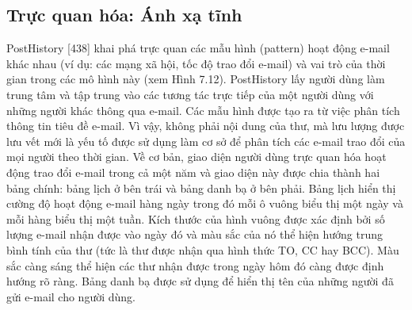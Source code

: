 \subsection{Trực quan hóa: Ánh xạ tĩnh}
PostHistory [438] khai phá trực quan các mẫu hình (pattern) hoạt động e-mail khác nhau (ví dụ: các mạng xã hội, tốc độ trao đổi e-mail) và vai trò của thời gian trong các mô hình này (xem Hình 7.12). PostHistory lấy người dùng làm trung tâm và tập trung vào các tương tác trực tiếp của một người dùng với những người khác thông qua e-mail. Các mẫu hình được tạo ra từ việc phân tích thông tin tiêu đề e-mail. Vì vậy, không phải nội dung của thư, mà lưu lượng được lưu vết mới là yếu tố được sử dụng làm cơ sở để phân tích các e-mail trao đổi của mọi người theo thời gian. Về cơ bản, giao diện người dùng trực quan hóa hoạt động trao đổi e-mail trong cả một năm và giao diện này được chia thành hai bảng chính: bảng lịch ở bên trái và bảng danh bạ ở bên phải. Bảng lịch hiển thị cường độ hoạt động e-mail hàng ngày trong đó mỗi ô vuông biểu thị một ngày và mỗi hàng biểu thị một tuần. Kích thước của hình vuông được xác định bởi số lượng e-mail nhận được vào ngày đó và màu sắc của nó thể hiện hướng trung bình tính của thư (tức là thư được nhận qua hình thức TO, CC hay BCC). Màu sắc càng sáng thể hiện các thư nhận được trong ngày hôm đó càng được định hướng rõ ràng. Bảng danh bạ được sử dụng để hiển thị tên của những người đã gửi e-mail cho người dùng.